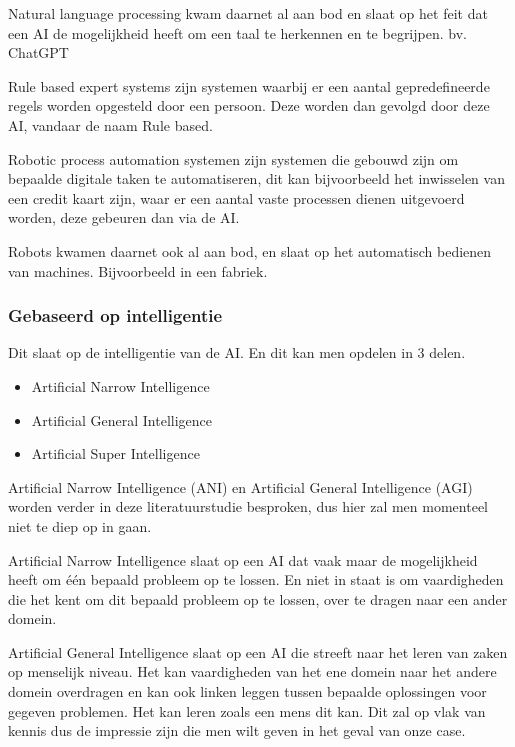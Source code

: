     Natural language processing kwam daarnet al aan bod en slaat op het feit dat een AI de mogelijkheid heeft om een taal te herkennen en te begrijpen. bv. ChatGPT
    
    Rule based expert systems zijn systemen waarbij er een aantal gepredefineerde regels worden opgesteld door een persoon. Deze worden dan gevolgd door deze AI, vandaar de naam Rule based.
    
    Robotic process automation systemen zijn systemen die gebouwd zijn om bepaalde digitale taken te automatiseren, dit kan bijvoorbeeld het inwisselen van een credit kaart zijn, waar er een aantal vaste processen dienen uitgevoerd worden, deze gebeuren dan via de AI.
    
    Robots kwamen daarnet ook al aan bod, en slaat op het automatisch bedienen van machines. Bijvoorbeeld in een fabriek.
    
\subsubsection{Gebaseerd op intelligentie}

    Dit slaat op de intelligentie van de AI. En dit kan men opdelen in 3 delen.
    \begin{itemize}
        \item Artificial Narrow Intelligence
        \item Artificial General Intelligence
        \item Artificial Super Intelligence
    \end{itemize}

    Artificial Narrow Intelligence (ANI) en Artificial General Intelligence (AGI) worden verder in deze literatuurstudie besproken, dus hier zal men momenteel niet te diep op in gaan. 
    
    Artificial Narrow Intelligence slaat op een AI dat vaak maar de mogelijkheid heeft om één bepaald probleem op te lossen. En niet in staat is om vaardigheden die het kent om dit bepaald probleem op te lossen, over te dragen naar een ander domein. 
    
    Artificial General Intelligence slaat op een AI die streeft naar het leren van zaken op menselijk niveau. Het kan vaardigheden van het ene domein naar het andere domein overdragen en kan ook linken leggen tussen bepaalde oplossingen voor gegeven problemen. Het kan leren zoals een mens dit kan. Dit zal op vlak van kennis dus de impressie zijn die men wilt geven in het geval van onze case.
    
